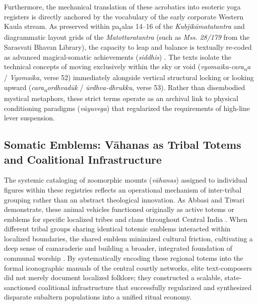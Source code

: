 \documentclass[11pt,twoside,letterpaper]{article}
\begin{document}
Furthermore, the mechanical translation of these acrobatics into esoteric yoga registers is directly anchored by the vocabulary of the early corporate Western Kaula stream. As preserved within pa\textsubscript{t}alas 14–16 of the \textit{Kubjik\={a}matatantra} and diagrammatic layout grids of the \textit{Matottaratantra} (such as \textit{Mss. 28/179} from the Sarasvati Bhavan Library), the capacity to leap and balance is textually re-coded as advanced magical-somatic achievements (\textit{siddhis}) \cite{Dehejia1986}. The texts isolate the technical concepts of moving exclusively within the sky or void (\textit{vyomaika-cara\textsubscript{n}a} / \textit{Vyomaika}, verse 52) immediately alongside vertical structural locking or looking upward (\textit{cara\textsubscript{n}ordhvad\={u}k} / \textit{\={u}rdhva-dhrukku}, verse 53). Rather than disembodied mystical metaphors, these strict terms operate as an archival link to physical conditioning paradigms (\textit{v\={a}yuvega}) that regularized the requirements of high-line lever suspension.

\subsection{Somatic Emblems: V\={a}hanas as Tribal Totems and Coalitional Infrastructure}
The systemic cataloging of zoomorphic mounts (\textit{v\={a}hanas}) assigned to individual figures within these registries reflects an operational mechanism of inter-tribal grouping rather than an abstract theological innovation. As Abbasi and Tiwari demonstrate, these animal vehicles functioned originally as active totems or emblems for specific localized tribes and clans throughout Central India \cite{Abbasi2001}. When different tribal groups sharing identical totemic emblems interacted within localized boundaries, the shared emblem minimized cultural friction, cultivating a deep sense of camaraderie and building a broader, integrated foundation of communal worship \cite{Abbasi2001}. By systematically encoding these regional totems into the formal iconographic manuals of the central courtly networks, elite text-composers did not merely document localized folklore; they constructed a scalable, state-sanctioned coalitional infrastructure that successfully regularized and synthesized disparate subaltern populations into a unified ritual economy.
\end{document}
